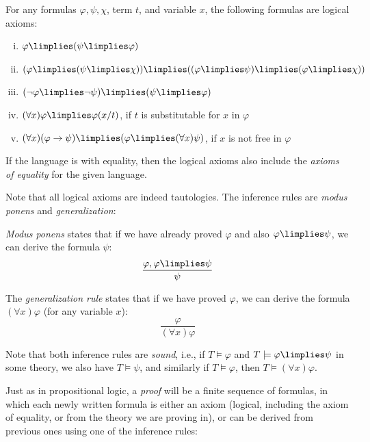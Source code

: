 \begin{definition}
For any formulas $\varphi,\psi,\chi$, term $t$, and variable $x$, the following formulas are logical axioms:
\begin{enumerate}[(i)]
    \item $\varphi \limplies (\psi \limplies \varphi)$
    \item $(\varphi\limplies (\psi \limplies \chi))\limplies ((\varphi \limplies \psi)\limplies(\varphi \limplies \chi))$
    \item $(\neg \varphi \limplies \neg \psi)\limplies(\psi \limplies \varphi)$
    \item $(\forall x)\varphi \limplies \varphi(x/t)$, if $t$ is substitutable for $x$ in $\varphi$
    \item $(\forall x)(\varphi \to \psi) \limplies (\varphi \limplies (\forall x)\psi)$, if $x$ is not free in $\varphi$
\end{enumerate}
If the language is with equality, then the logical axioms also include the \emph{axioms of equality} for the given language.       
\end{definition}

Note that all logical axioms are indeed tautologies. The inference rules are \emph{modus ponens} and \emph{generalization}: 

\begin{definition}
\emph{Modus ponens} states that if we have already proved $\varphi$ and also $\varphi\limplies\psi$, we can derive the formula $\psi$:
$$
\frac{\varphi, \varphi \limplies \psi}{\psi}
$$ 
\end{definition}

\begin{definition}
    The \emph{generalization rule} states that if we have proved $\varphi$, we can derive the formula $(\forall x)\varphi$ (for any variable $x$):
    $$
    \frac{\varphi}{(\forall x)\varphi}
    $$ 
\end{definition}

Note that both inference rules are \emph{sound}, i.e., if $T\models\varphi$ and $T\models\varphi\limplies\psi$ in some theory, we also have $T\models\psi$, and similarly if $T\models\varphi$, then $T\models(\forall x)\varphi$.

Just as in propositional logic, a \emph{proof} will be a finite sequence of formulas, in which each newly written formula is either an axiom (logical, including the axiom of equality, or from the theory we are proving in), or can be derived from previous ones using one of the inference rules:

